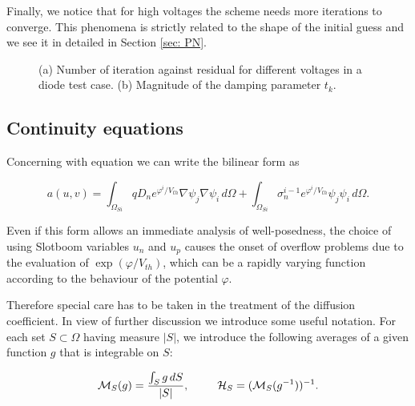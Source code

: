 Finally, we notice that for high voltages the scheme needs more iterations to converge. This phenomena is strictly related to the shape of the initial guess and we see it in detailed in Section \ref{sec: PN}. 

\begin{figure}[!h]
\centering



\caption{(a) Number of iteration against residual for different voltages in a diode test case. (b) Magnitude of the damping parameter $t_k$.}

\end{figure}

\clearpage


\subsection{Continuity equations}
\label{sec: continuity equations}

Concerning with equation  we can write the bilinear form as

\begin{equation}
\label{eq: weak formulation displacement}
a(u,v) =  \int_{\Omega_{Si}}  q D_n e^{\varphi^{i}/V_{th}} \nabla \psi_j \nabla \psi_i \, d\Omega + \int_{\Omega_{Si}} \sigma_n^{i-1} e^{\varphi^{i}/V_{th}} \psi_j \psi_i \, d\Omega.
\end{equation}

Even if this form allows an immediate analysis of well-posedness, the choice of using Slotboom variables $u_n$ and $u_p$ causes the onset of overflow problems due to the evaluation of $\exp(\varphi/V_{th})$, which can be a rapidly varying function according to the behaviour of the potential $\varphi$.

Therefore special care has to be taken in the treatment of the diffusion coefficient. In view of further discussion we introduce some useful notation. For each set $S \subset \Omega$ having measure $|S|$, we introduce the following averages of a given function $g$ that is integrable on $S$:

\begin{equation*}
\mathcal{M}_S(g) = \dfrac{\int_S g \, dS}{|S|}, \psp{15} \mathcal{H}_S = (\mathcal{M}_S(g^{-1}))^{-1} .
\end{equation*}

